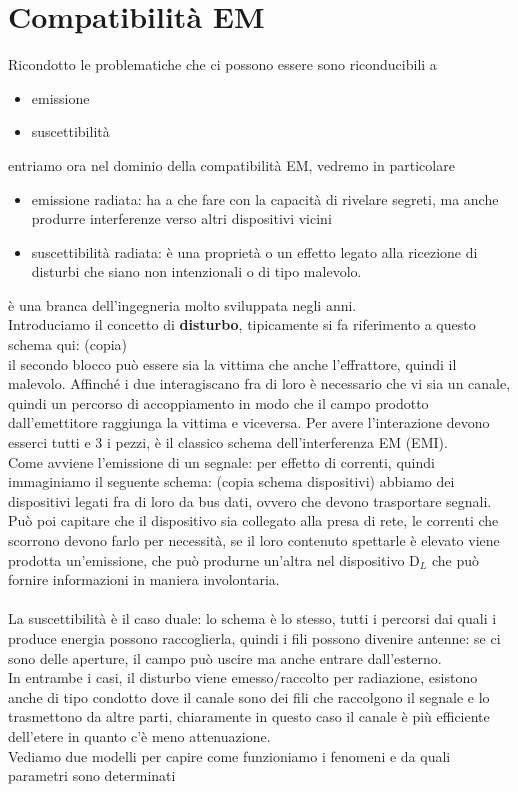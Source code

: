\documentclass[oneside, 12pt]{extbook}
\begin{document}
\section{Compatibilità EM}
Ricondotto le problematiche che ci possono essere sono riconducibili a  
\begin{itemize}
	\item emissione
	\item suscettibilità 
\end{itemize}
entriamo ora nel dominio della compatibilità EM, vedremo in particolare
\begin{itemize}
	\item emissione radiata: ha a che fare con la capacità di rivelare segreti, ma anche produrre interferenze verso altri dispositivi vicini
	\item suscettibilità radiata: è una proprietà o un effetto legato alla ricezione di disturbi che siano non intenzionali o di tipo malevolo.
\end{itemize}
è una branca dell'ingegneria molto sviluppata negli anni.\\Introduciamo il concetto di \textbf{disturbo}, tipicamente si fa riferimento a questo schema qui: (copia)\\
il secondo blocco può essere sia la vittima che anche l'effrattore, quindi il malevolo. Affinché i due interagiscano fra di loro è necessario che vi sia un canale, quindi un percorso di accoppiamento in modo che il campo prodotto dall'emettitore raggiunga la vittima e viceversa. Per avere l'interazione devono esserci tutti e 3 i pezzi, è il classico schema dell'interferenza EM (EMI).\\Come avviene l'emissione di un segnale: per effetto di correnti, quindi immaginiamo il seguente schema: (copia schema dispositivi) abbiamo dei dispositivi legati fra di loro da bus dati, ovvero che devono trasportare segnali.\\Può poi capitare che il dispositivo sia collegato alla presa di rete, le correnti che scorrono devono farlo per necessità, se il loro contenuto spettarle è elevato viene prodotta un'emissione, che può produrne un'altra nel dispositivo D$_L$ che può fornire informazioni in maniera involontaria.\\\\La suscettibilità è il caso duale: lo schema è lo stesso, tutti i percorsi dai quali i produce energia possono raccoglierla, quindi i fili possono divenire antenne: se ci sono delle aperture, il campo può uscire ma anche entrare dall'esterno.\\In entrambe i casi, il disturbo viene emesso/raccolto per radiazione, esistono anche di tipo condotto dove il canale sono dei fili che raccolgono il segnale e lo trasmettono da altre parti, chiaramente in questo caso il canale è più efficiente dell'etere in quanto c'è meno attenuazione.\\Vediamo due modelli per capire come funzioniamo i fenomeni e da quali parametri sono determinati
\end{document}
